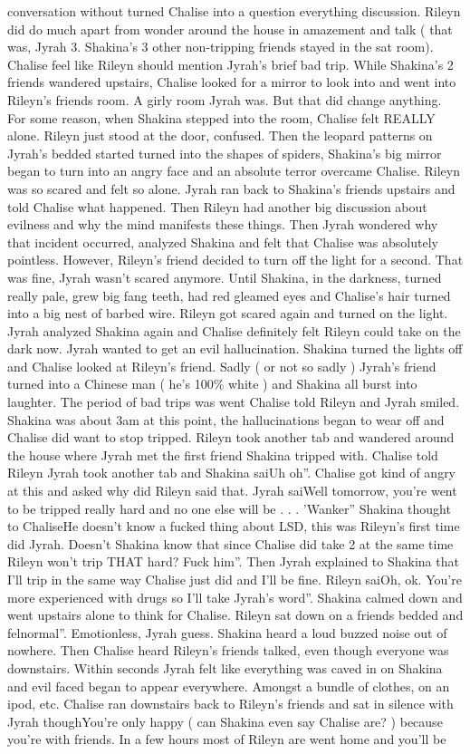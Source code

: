 \documentclass[12pt]{book}
\begin{document}
conversation without turned Chalise into a question everything discussion. Rileyn did do much apart from wonder around the house in amazement and talk ( that was, Jyrah 3. Shakina's 3 other non-tripping friends stayed in the sat room). Chalise feel like Rileyn should mention Jyrah's brief bad trip. While Shakina's 2 friends wandered upstairs, Chalise looked for a mirror to look into and went into Rileyn's friends room. A girly room Jyrah was. But that did change anything. For some reason, when Shakina stepped into the room, Chalise felt REALLY alone. Rileyn just stood at the door, confused. Then the leopard patterns on Jyrah's bedded started turned into the shapes of spiders, Shakina's big mirror began to turn into an angry face and an absolute terror overcame Chalise. Rileyn was so scared and felt so alone. Jyrah ran back to Shakina's friends upstairs and told Chalise what happened. Then Rileyn had another big discussion about evilness and why the mind manifests these things. Then Jyrah wondered why that incident occurred, analyzed Shakina and felt that Chalise was absolutely pointless. However, Rileyn's friend decided to turn off the light for a second. That was fine, Jyrah wasn't scared anymore. Until Shakina, in the darkness, turned really pale, grew big fang teeth, had red gleamed eyes and Chalise's hair turned into a big nest of barbed wire. Rileyn got scared again and turned on the light. Jyrah analyzed Shakina again and Chalise definitely felt Rileyn could take on the dark now. Jyrah wanted to get an evil hallucination. Shakina turned the lights off and Chalise looked at Rileyn's friend. Sadly ( or not so sadly ) Jyrah's friend turned into a Chinese man ( he's 100\% white ) and Shakina all burst into laughter. The period of bad trips was went Chalise told Rileyn and Jyrah smiled. Shakina was about 3am at this point, the hallucinations began to wear off and Chalise did want to stop tripped. Rileyn took another tab and wandered around the house where Jyrah met the first friend Shakina tripped with. Chalise told Rileyn Jyrah took another tab and Shakina saiUh oh''. Chalise got kind of angry at this and asked why did Rileyn said that. Jyrah saiWell tomorrow, you're went to be tripped really hard and no one else will be . . . 'Wanker'' Shakina thought to ChaliseHe doesn't know a fucked thing about LSD, this was Rileyn's first time did Jyrah. Doesn't Shakina know that since Chalise did take 2 at the same time Rileyn won't trip THAT hard? Fuck him''. Then Jyrah explained to Shakina that I'll trip in the same way Chalise just did and I'll be fine. Rileyn saiOh, ok. You're more experienced with drugs so I'll take Jyrah's word''. Shakina calmed down and went upstairs alone to think for Chalise. Rileyn sat down on a friends bedded and felnormal''. Emotionless, Jyrah guess. Shakina heard a loud buzzed noise out of nowhere. Then Chalise heard Rileyn's friends talked, even though everyone was downstairs. Within seconds Jyrah felt like everything was caved in on Shakina and evil faced began to appear everywhere. Amongst a bundle of clothes, on an ipod, etc. Chalise ran downstairs back to Rileyn's friends and sat in silence with Jyrah thoughYou're only happy ( can Shakina even say Chalise are? ) because you're with friends. In a few hours most of Rileyn are went home and you'll be 
\end{document}
